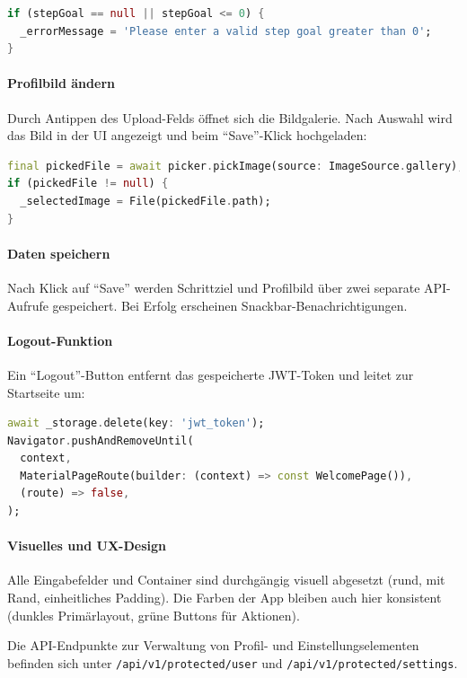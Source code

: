 \documentclass[11pt,a4paper]{article}
\begin{document}
\begin{lstlisting}[language=Dart, caption=Gültigkeitsprüfung Schrittziel]
if (stepGoal == null || stepGoal <= 0) {
  _errorMessage = 'Please enter a valid step goal greater than 0';
}
\end{lstlisting}

\paragraph{Profilbild ändern}
Durch Antippen des Upload-Felds öffnet sich die Bildgalerie. Nach Auswahl wird das Bild in der UI angezeigt und beim ``Save''-Klick hochgeladen:

\begin{lstlisting}[language=Dart, caption=Bild aus Galerie auswählen]
final pickedFile = await picker.pickImage(source: ImageSource.gallery);
if (pickedFile != null) {
  _selectedImage = File(pickedFile.path);
}
\end{lstlisting}

\paragraph{Daten speichern}
Nach Klick auf ``Save'' werden Schrittziel und Profilbild über zwei separate API-Aufrufe gespeichert. Bei Erfolg erscheinen Snackbar-Benachrichtigungen.

\paragraph{Logout-Funktion}
Ein ``Logout''-Button entfernt das gespeicherte JWT-Token und leitet zur Startseite um:

\begin{lstlisting}[language=Dart, caption=Abmelden und Navigation zur Welcome-Seite]
await _storage.delete(key: 'jwt_token');
Navigator.pushAndRemoveUntil(
  context,
  MaterialPageRoute(builder: (context) => const WelcomePage()),
  (route) => false,
);
\end{lstlisting}

\paragraph{Visuelles und UX-Design}
Alle Eingabefelder und Container sind durchgängig visuell abgesetzt (rund, mit Rand, einheitliches Padding). Die Farben der App bleiben auch hier konsistent (dunkles Primärlayout, grüne Buttons für Aktionen).

\vspace{1em}
Die API-Endpunkte zur Verwaltung von Profil- und Einstellungselementen befinden sich unter \texttt{/api/v1/protected/user} und \texttt{/api/v1/protected/settings}.
\end{document}
